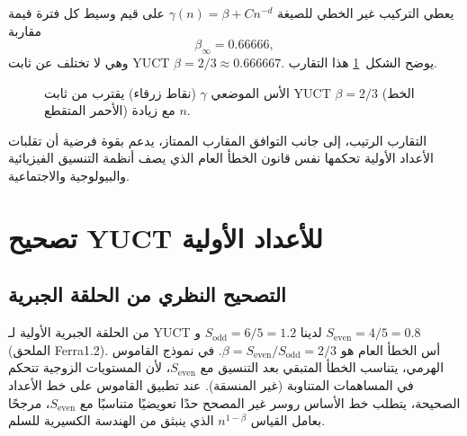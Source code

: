 \documentclass[11pt,a4paper]{article}
\newcommand{\Sodd}{S_{\mathrm{odd}}}
\newcommand{\Seven}{S_{\mathrm{even}}}
\begin{document}
	يعطي التركيب غير الخطي للصيغة $\gamma(n) = \beta + C n^{-d}$ على قيم وسيط كل فترة قيمة مقاربة
	\[
	\beta_{\infty} = 0.66666,
	\]
	وهي لا تختلف عن ثابت YUCT $\beta = 2/3 \approx 0.666667$. يوضح الشكل~\ref{fig:gamma-convergence} هذا التقارب.
	
	\begin{figure}[htbp]
		\centering
		\caption{الأس الموضعي $\gamma$ (نقاط زرقاء) يقترب من ثابت YUCT $\beta = 2/3$ (الخط الأحمر المتقطع) مع زيادة $n$.}
		\label{fig:gamma-convergence}
	\end{figure}
	
	التقارب الرتيب، إلى جانب التوافق المقارب الممتاز، يدعم بقوة فرضية أن تقلبات الأعداد الأولية تحكمها نفس قانون الخطأ العام الذي يصف أنظمة التنسيق الفيزيائية والبيولوجية والاجتماعية.
	
	\section{تصحيح YUCT للأعداد الأولية}
	\subsection{التصحيح النظري من الحلقة الجبرية}
	من الحلقة الجبرية الأولية لـ YUCT لدينا $\Sodd = 6/5 = 1.2$ و $\Seven = 4/5 = 0.8$ (الملحق Ferra1.2). أس الخطأ العام هو $\beta = \Seven/\Sodd = 2/3$. في نموذج القاموس الهرمي، يتناسب الخطأ المتبقي بعد التنسيق مع $\Seven$، لأن المستويات الزوجية تتحكم في المساهمات المتناوبة (غير المنسقة). عند تطبيق القاموس على خط الأعداد الصحيحة، يتطلب خط الأساس روسر غير المصحح حدًا تعويضيًا متناسبًا مع $\Seven$، مرجحًا بعامل القياس $n^{1-\beta}$ الذي ينبثق من الهندسة الكسيرية للسلم.
	
\end{document}
